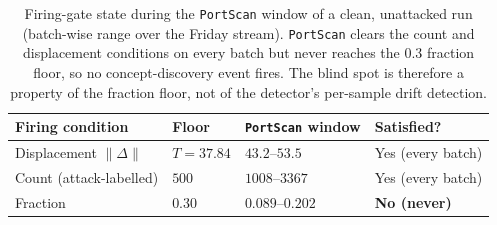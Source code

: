 \begin{table}[H]
\centering
\caption{Firing-gate state during the \texttt{PortScan} window of a clean, unattacked run (batch-wise range over the Friday stream). \texttt{PortScan} clears the count and displacement conditions on every batch but never reaches the $0.3$ fraction floor, so no concept-discovery event fires. The blind spot is therefore a property of the fraction floor, not of the detector's per-sample drift detection.}
\label{tab:portscan-gate}
\begin{tabular}{@{}llll@{}}
\toprule
Firing condition & Floor & \texttt{PortScan} window & Satisfied? \\
\midrule
Displacement $\|\Delta\|$   & $T = 37.84$ & $43.2$--$53.5$   & Yes (every batch) \\
Count (attack-labelled)     & $500$      & $1008$--$3367$   & Yes (every batch) \\
Fraction                    & $0.30$     & $0.089$--$0.202$ & \textbf{No (never)} \\
\bottomrule
\end{tabular}
\end{table}
